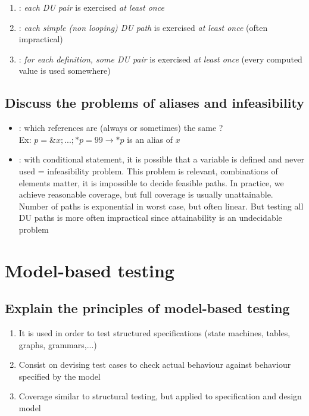 \begin{enumerate}
    \item {}: \textit{each DU pair} is exercised \textit{at least once}
    \item {} : \textit{each simple (non looping) DU path} is exercised \textit{at least once} (often impractical)
    \item {}: \textit{for each definition, some DU pair} is exercised \textit{at least once} (every computed value is used somewhere)
\end{enumerate}

\section{Discuss the problems of aliases and infeasibility}

\begin{itemize}
    \item {} : which references are (always or sometimes) the same ?\\
    Ex: $p=\&x; ...; *p=99 \rightarrow *p$ is an alias of $x$
    \item {}: with conditional statement, it is possible that a variable is defined and never used = infeasibility problem. This problem is relevant, combinations of elements matter, it is impossible to decide feasible paths. In practice, we achieve reasonable coverage, but full coverage is usually unattainable. Number of paths is exponential in worst case, but often linear. But testing all DU paths is more often impractical since attainability is an undecidable problem
\end{itemize}

\chapter{Model-based testing}

\section{Explain the principles of model-based testing}

\begin{enumerate}
    \item It is used in order to test structured specifications (state machines, tables, graphs, grammars,...)
    \item Consist on devising test cases to check actual behaviour against behaviour specified by the model
    \item Coverage similar to structural testing, but applied to specification and design model
\end{enumerate}

